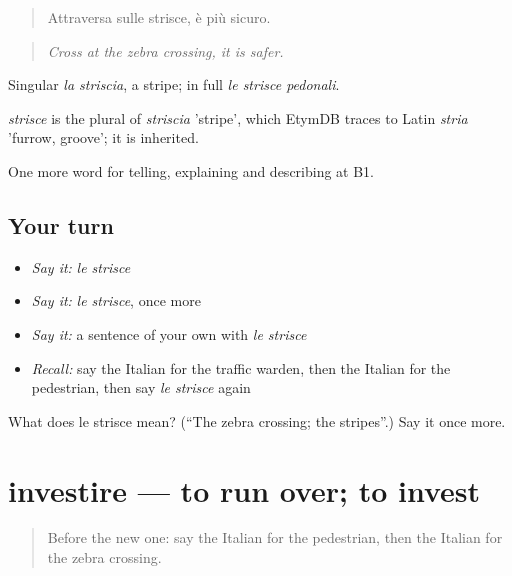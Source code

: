 \begin{quote}
Attraversa sulle strisce, è più sicuro.
\end{quote}

\begin{quote}
\emph{Cross at the zebra crossing, it is safer.}
\end{quote}

Singular \emph{la striscia}, a stripe; in full \emph{le strisce pedonali}.

\begin{cousinweb}
\emph{strisce} is the plural of \emph{striscia} 'stripe', which EtymDB traces to Latin \emph{stria} 'furrow, groove'; it is inherited.
\end{cousinweb}

\begin{grammarlens}[title={What you've built}]
One more word for telling, explaining and describing at B1.
\end{grammarlens}

\subsection*{Your turn}
\begin{itemize}
\raggedright
  \item \emph{Say it:} \emph{le strisce}
  \item \emph{Say it:} \emph{le strisce}, once more
  \item \emph{Say it:} a sentence of your own with \emph{le strisce}
  \item \emph{Recall:} say the Italian for the traffic warden, then the Italian for the pedestrian, then say \emph{le strisce} again
\end{itemize}

\begin{tcolorbox}[breakable,colback=teal!4,colframe=teal!35!black,title={Before you move on}]
What does le strisce mean? (\textquotedblleft{}The zebra crossing; the stripes\textquotedblright{}.) Say it once more.
\end{tcolorbox}
\section[investire]{investire — to run over; to invest}

\label{lesson:IT-C412-investire}



\begin{quote}
Before the new one: say the Italian for the pedestrian, then the Italian for the zebra crossing.
\end{quote}


